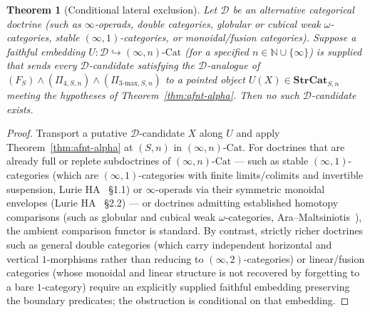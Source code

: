 \documentclass[11pt]{article}
\theoremstyle{plain}
\newtheorem{theorem}{Theorem}[section]
\theoremstyle{definition}
\newcommand{\Cat}{\mathrm{Cat}}
\begin{document}
\begin{theorem}[Conditional lateral exclusion]\label{thm:lateral}
Let $\mathcal{D}$ be an alternative categorical doctrine (such as $\infty$-operads, double categories, globular or cubical weak $\omega$-categories, stable $(\infty, 1)$-categories, or monoidal/fusion categories). Suppose a faithful embedding $U : \mathcal{D} \hookrightarrow (\infty, n)\text{-}\Cat$ (for a specified $n \in \mathbb{N} \cup \{\infty\}$) is supplied that sends every $\mathcal{D}$-candidate satisfying the $\mathcal{D}$-analogue of $(F_S) \wedge (\Pi_{4, S, n}) \wedge (\Pi_{3\text{-max}, S, n})$ to a pointed object $U(X) \in \mathbf{StrCat}_{S, n}$ meeting the hypotheses of Theorem~\ref{thm:afnt-alpha}. Then no such $\mathcal{D}$-candidate exists.
\end{theorem}

\begin{proof}
Transport a putative $\mathcal{D}$-candidate $X$ along $U$ and apply Theorem~\ref{thm:afnt-alpha} at $(S, n)$ in $(\infty, n)\text{-}\Cat$. For doctrines that are already full or replete subdoctrines of $(\infty, n)\text{-}\Cat$ --- such as stable $(\infty, 1)$-categories (which are $(\infty, 1)$-categories with finite limits/colimits and invertible suspension, Lurie HA~\cite{LurieHA} \S 1.1) or $\infty$-operads via their symmetric monoidal envelopes (Lurie HA~\cite{LurieHA} \S 2.2) --- or doctrines admitting established homotopy comparisons (such as globular and cubical weak $\omega$-categories, Ara--Maltsiniotis~\cite{AraMaltsiniotis2017}), the ambient comparison functor is standard. By contrast, strictly richer doctrines such as general double categories (which carry independent horizontal and vertical $1$-morphisms rather than reducing to $(\infty, 2)$-categories) or linear/fusion categories (whose monoidal and linear structure is not recovered by forgetting to a bare $1$-category) require an explicitly supplied faithful embedding preserving the boundary predicates; the obstruction is conditional on that embedding.
\end{proof}
\end{document}
